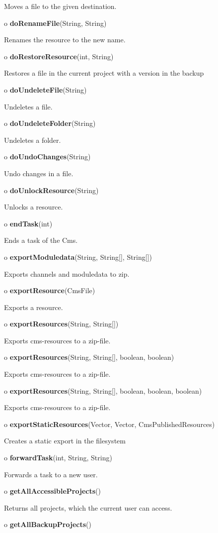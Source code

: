 \begin{description}
Moves a file to the given destination.  
\item o {\bf doRenameFile}(String, String)  

Renames the resource to the new name.  
\item o {\bf doRestoreResource}(int, String)  

Restores a file in the current project with a version in the backup  
\item o {\bf doUndeleteFile}(String)  

Undeletes a file.  
\item o {\bf doUndeleteFolder}(String)  

Undeletes a folder.  
\item o {\bf doUndoChanges}(String)  

Undo changes in a file.  
\item o {\bf doUnlockResource}(String)  

Unlocks a resource.  
\item o {\bf endTask}(int)  

Ends a task of the Cms.  
\item o {\bf exportModuledata}(String, String[], String[])  

Exports channels and moduledata to zip.  
\item o {\bf exportResource}(CmsFile)  

Exports a resource.  
\item o {\bf exportResources}(String, String[])  

Exports cms-resources to a zip-file.  
\item o {\bf exportResources}(String, String[], boolean, boolean)  

Exports cms-resources to a zip-file.  
\item o {\bf exportResources}(String, String[], boolean, boolean, boolean)  

Exports cms-resources to a zip-file.  
\item o {\bf exportStaticResources}(Vector, Vector, CmsPublishedResources)  

Creates a static export in the filesystem  
\item o {\bf forwardTask}(int, String, String)  

Forwards a task to a new user.  
\item o {\bf getAllAccessibleProjects}()  

Returns all projects, which the current user can access.  
\item o {\bf getAllBackupProjects}()  


\end{description}
